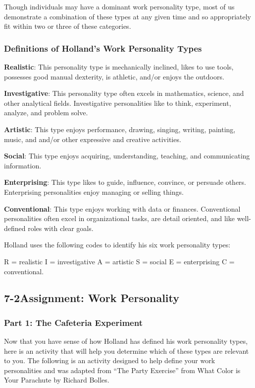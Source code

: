 Though individuals may have a dominant work personality type, most of us demonstrate a combination of these types at any given time and so appropriately fit within two or three of these categories.
\subsubsection*{Definitions of Holland's Work Personality Types}
\textbf{Realistic}: This personality type is mechanically inclined, likes to use tools, possesses good manual dexterity, is athletic, and/or enjoys the outdoors.

\textbf{Investigative}: This personality type often excels in mathematics, science, and other analytical fields. Investigative personalities like to think, experiment, analyze, and problem solve.

\textbf{Artistic}: This type enjoys performance, drawing, singing, writing, painting, music, and and/or other expressive and creative activities.

\textbf{Social}: This type enjoys acquiring, understanding, teaching, and communicating information.

\textbf{Enterprising}: This type likes to guide, influence, convince, or persuade others. Enterprising personalities enjoy managing or selling things.

\textbf{Conventional}: This type enjoys working with data or finances. Conventional personalities often excel in organizational tasks, are detail oriented, and like well-defined roles with clear goals.

Holland uses the following codes to identify his six work personality types: 

R = realistic
\break I = investigative
\break A = artistic
\break S = social
\break E = enterprising
\break C = conventional.
\pagebreak \subsection*{7-2\quad Assignment: Work Personality}
\subsubsection*{Part 1: The Cafeteria Experiment}
Now that you have sense of how Holland has defined his work personality types, here is an activity that will help you determine which of these types are relevant to you. The following is an activity designed to help define your work personalities and was adapted from ``The Party Exercise'' from What Color is Your Parachute by Richard Bolles.

